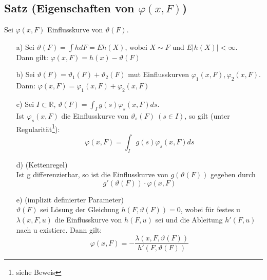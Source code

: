 \documentclass[a4paper,11pt,twoside,titlepage]{article}
\newcommand{\R}{{\mathbb R}}
\begin{document}
\subsection{Satz \textnormal{(Eigenschaften von $\varphi(x,F)$)}}
Sei $\varphi(x,F)$ Einflusskurve von $\vartheta(F)$.
\begin{itemize}
\item[a)] Sei $\vartheta(F)=\int hdF=Eh(X)$, wobei $X\sim F$ und $E|h(X)|<\infty$.\\
Dann gilt: $\varphi(x,F)=h(x)-\vartheta(F)$
\item[b)] Sei $\vartheta(F)=\vartheta_1(F)+\vartheta_2(F)$ mut Einflusskurven $\varphi_1(x,F),\varphi_2(x,F)$.\\
Dann: $\varphi(x,F)=\varphi_1(x,F)+\varphi_2(x,F)$
\item[c)] Sei $I\subset\R$, $\vartheta(F)=\int_I g(s)\varphi_s(x,F)ds$.\\
Ist $\varphi_s(x,F)$ die Einflusskurve von $\vartheta_s(F)\ (s\in I)$, so gilt (unter Regularität\footnote{siehe Beweis}):
\[\varphi(x,F)=\int_I g(s)\varphi_s(x,F)ds\]
\item[d)] (Kettenregel)\\
Ist g differenzierbar, so ist die Einflusskurve von $g(\vartheta(F))$ gegeben durch 
\[g'(\vartheta(F))\cdot\varphi(x,F)\]
\item[e)] (implizit definierter Parameter)\\
$\vartheta(F)$ sei Lösung der Gleichung $h(F,\vartheta(F))=0$, wobei für festes u $\lambda(x,F,u)$ die Einflusskurve von $h(F,u)$ sei und die Ableitung $h'(F,u)$ nach u existiere. Dann gilt:
\[\varphi(x,F)=-\frac{\lambda(x,F,\vartheta(F))}{h'(F,\vartheta(F))}\]
\end{itemize}
\end{document}
